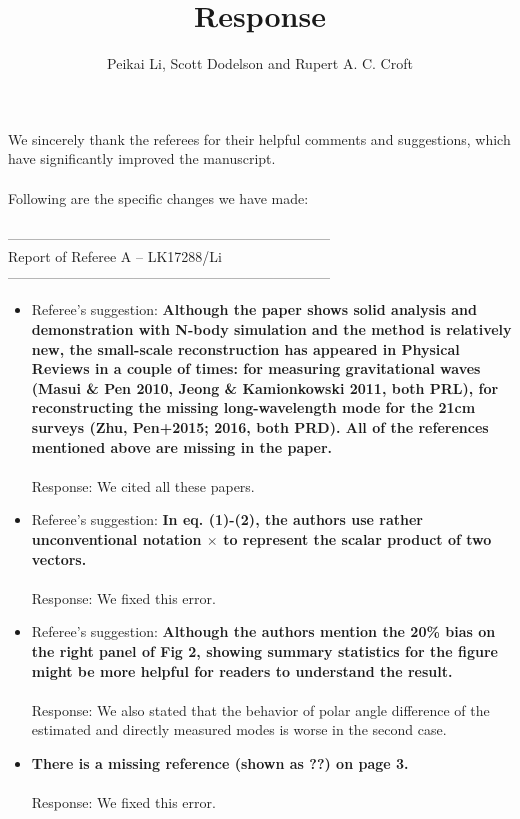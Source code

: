 \documentclass{article}
\title{Response}
\author{Peikai Li, Scott Dodelson and Rupert A. C. Croft}
\date{}
\begin{document}
\maketitle
\noindent We sincerely thank the referees for their helpful comments and suggestions, which have significantly improved the manuscript.\\ \\
Following are the specific changes we have made:\\ \\
---------------------------------------------------------------------\\
Report of Referee A -- LK17288/Li\\
---------------------------------------------------------------------\\
\begin{itemize}
\item Referee's suggestion: \textbf{Although the paper shows solid analysis and demonstration with N-body
simulation and the method is relatively new, the small-scale
reconstruction has appeared in Physical Reviews in a couple of times:
for measuring gravitational waves (Masui \& Pen 2010, Jeong \&
Kamionkowski 2011, both PRL), for reconstructing the missing
long-wavelength mode for the 21cm surveys (Zhu, Pen+2015; 2016, both
PRD). All of the references mentioned above are missing in the paper.} \\ \\
Response: We cited all these papers.
\item Referee's suggestion: \textbf{In eq. (1)-(2), the authors use rather unconventional notation
$\times$ to represent the scalar product of two vectors.}
\\ \\Response: We fixed this error. 
\item Referee's suggestion: \textbf{Although the authors mention the 20\% bias on the right panel of Fig
2, showing summary statistics for the figure might be more helpful for
readers to understand the result.}
\\ \\Response: We also stated that the behavior of polar angle difference of the estimated and directly measured modes is worse in the second case. 
\item \textbf{There is a missing reference (shown as ??) on page 3.}\\ \\
Response: We fixed this error.\\

\end{itemize}
\end{document}
